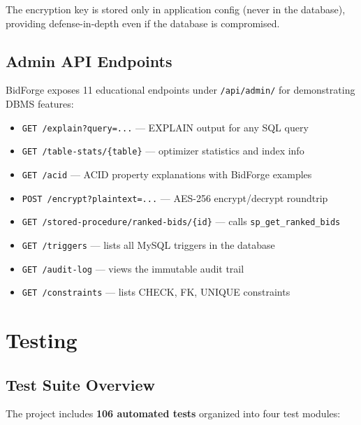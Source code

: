 \documentclass[12pt, a4paper]{report}
\begin{document}
The encryption key is stored only in application config (never in the database), providing defense-in-depth even if the database is compromised.

\section{Admin API Endpoints}

BidForge exposes 11 educational endpoints under \texttt{/api/admin/} for demonstrating DBMS features:

\begin{itemize}
  \item \texttt{GET /explain?query=...} --- EXPLAIN output for any SQL query
  \item \texttt{GET /table-stats/\{table\}} --- optimizer statistics and index info
  \item \texttt{GET /acid} --- ACID property explanations with BidForge examples
  \item \texttt{POST /encrypt?plaintext=...} --- AES-256 encrypt/decrypt roundtrip
  \item \texttt{GET /stored-procedure/ranked-bids/\{id\}} --- calls \texttt{sp\_get\_ranked\_bids}
  \item \texttt{GET /triggers} --- lists all MySQL triggers in the database
  \item \texttt{GET /audit-log} --- views the immutable audit trail
  \item \texttt{GET /constraints} --- lists CHECK, FK, UNIQUE constraints
\end{itemize}

\chapter{Testing}

\section{Test Suite Overview}

The project includes \textbf{106 automated tests} organized into four test modules:
\end{document}

